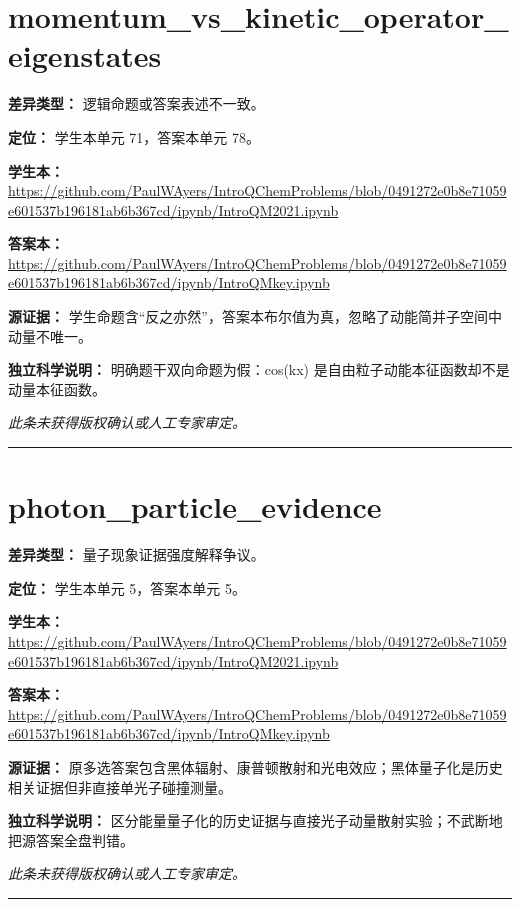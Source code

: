 \documentclass[UTF8,11pt,oneside,openany,fontset=none]{ctexbook}
\begin{document}
\section{momentum\_vs\_kinetic\_operator\_eigenstates}
\noindent\textbf{差异类型：} 逻辑命题或答案表述不一致。\par
\noindent\textbf{定位：} 学生本单元 71，答案本单元 78。\par
\noindent\textbf{学生本：} \url{https://github.com/PaulWAyers/IntroQChemProblems/blob/0491272e0b8e71059e601537b196181ab6b367cd/ipynb/IntroQM2021.ipynb}\par
\noindent\textbf{答案本：} \url{https://github.com/PaulWAyers/IntroQChemProblems/blob/0491272e0b8e71059e601537b196181ab6b367cd/ipynb/IntroQMkey.ipynb}\par
\noindent\textbf{源证据：} 学生命题含“反之亦然”，答案本布尔值为真，忽略了动能简并子空间中动量不唯一。\par
\noindent\textbf{独立科学说明：} 明确题干双向命题为假：cos(kx) 是自由粒子动能本征函数却不是动量本征函数。\par
\medskip\noindent\textit{此条未获得版权确认或人工专家审定。}
\medskip\hrule\medskip
\section{photon\_particle\_evidence}
\noindent\textbf{差异类型：} 量子现象证据强度解释争议。\par
\noindent\textbf{定位：} 学生本单元 5，答案本单元 5。\par
\noindent\textbf{学生本：} \url{https://github.com/PaulWAyers/IntroQChemProblems/blob/0491272e0b8e71059e601537b196181ab6b367cd/ipynb/IntroQM2021.ipynb}\par
\noindent\textbf{答案本：} \url{https://github.com/PaulWAyers/IntroQChemProblems/blob/0491272e0b8e71059e601537b196181ab6b367cd/ipynb/IntroQMkey.ipynb}\par
\noindent\textbf{源证据：} 原多选答案包含黑体辐射、康普顿散射和光电效应；黑体量子化是历史相关证据但非直接单光子碰撞测量。\par
\noindent\textbf{独立科学说明：} 区分能量量子化的历史证据与直接光子动量散射实验；不武断地把源答案全盘判错。\par
\medskip\noindent\textit{此条未获得版权确认或人工专家审定。}
\medskip\hrule\medskip
\end{document}
